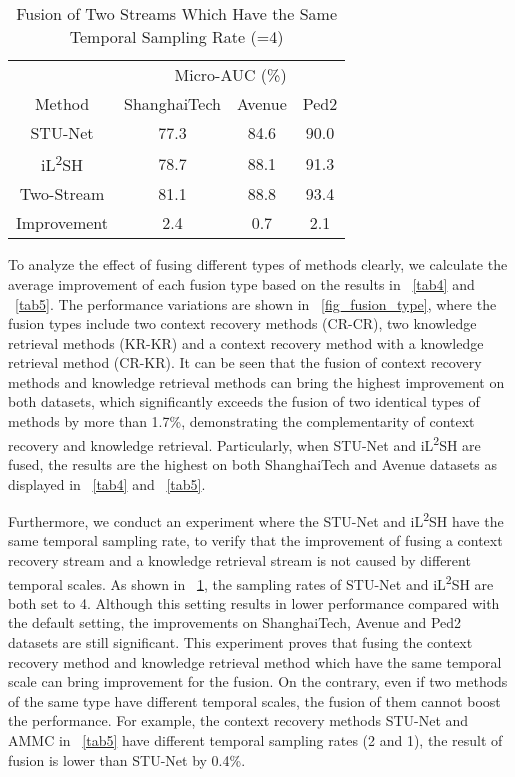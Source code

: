 \documentclass[lettersize,journal]{IEEEtran}
\begin{document}
\begin{table}[!t]
	\centering
	\caption{Fusion of Two Streams Which Have the Same Temporal Sampling Rate (=4)}
	\label{tab6}
	\begin{tabular}{@{}cccc@{}}
		\toprule
		& \multicolumn{3}{c}{Micro-AUC (\%)} \\ \cmidrule(l){2-4} 
		Method    					& ShanghaiTech    & Avenue    & Ped2   \\ \midrule
		STU-Net    					& 77.3            & 84.6      & 90.0   \\
		iL\textsuperscript{2}SH     & 78.7      	  & 88.1      & 91.3   \\
		Two-Stream 					& 81.1            & 88.8      & 93.4   \\
		Improvement 				& 2.4             & 0.7       & 2.1    \\ \bottomrule
	\end{tabular}
\end{table}


To analyze the effect of fusing different types of methods clearly, we calculate the average improvement of each fusion type based on the results in \tablename~\ref{tab4} and \tablename~\ref{tab5}.
The performance variations are shown in \figurename~\ref{fig_fusion_type}, where the fusion types include two context recovery methods (CR-CR), two knowledge retrieval methods (KR-KR) and a context recovery method with a knowledge retrieval method (CR-KR).
It can be seen that the fusion of context recovery methods and knowledge retrieval methods can bring the highest improvement on both datasets, which significantly exceeds the fusion of two identical types of methods by more than 1.7\%, demonstrating the complementarity of context recovery and knowledge retrieval.
Particularly, when STU-Net and iL\textsuperscript{2}SH are fused, the results are the highest on both ShanghaiTech and Avenue datasets as displayed in \tablename~\ref{tab4} and \tablename~\ref{tab5}.


Furthermore, we conduct an experiment where the STU-Net and iL\textsuperscript{2}SH have the same temporal sampling rate, to verify that the improvement of fusing a context recovery stream and a knowledge retrieval stream is not caused by different temporal scales.
As shown in \tablename~\ref{tab6}, the sampling rates of STU-Net and iL\textsuperscript{2}SH are both set to 4.
Although this setting results in lower performance compared with the default setting, the improvements on ShanghaiTech, Avenue and Ped2 datasets are still significant.
This experiment proves that fusing the context recovery method and knowledge retrieval method which have the same temporal scale can bring improvement for the fusion.
On the contrary, even if two methods of the same type have different temporal scales, the fusion of them cannot boost the performance.
For example, the context recovery methods STU-Net and AMMC in \tablename~\ref{tab5} have different temporal sampling rates (2 and 1), the result of fusion is lower than STU-Net by 0.4\%.
\end{document}
